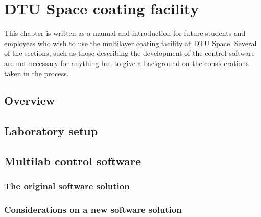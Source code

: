 \chapter{DTU Space coating facility}

This chapter is written as a manual and introduction for future students and employees who wish to use the multilayer coating facility at DTU Space. Several of the sections, such as those describing the development of the control software are not necessary for anything but to give a background on the considerations taken in the process.

\section{Overview}


\section{Laboratory setup}
\section{Multilab control software}
\subsection{The original software solution}
\subsection{Considerations on a new software solution}
